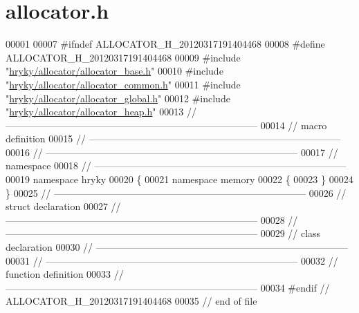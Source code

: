 \hypertarget{allocator_8h_source}{\section{allocator.\-h}
}

\begin{DoxyCode}
00001 
00007 \textcolor{preprocessor}{#ifndef ALLOCATOR\_H\_20120317191404468}
00008 \textcolor{preprocessor}{}\textcolor{preprocessor}{#define ALLOCATOR\_H\_20120317191404468}
00009 \textcolor{preprocessor}{}\textcolor{preprocessor}{#include "\hyperlink{allocator__base_8h}{hryky/allocator/allocator_base.h}"}
00010 \textcolor{preprocessor}{#include "\hyperlink{allocator__common_8h}{hryky/allocator/allocator_common.h}"}
00011 \textcolor{preprocessor}{#include "\hyperlink{allocator__global_8h}{hryky/allocator/allocator_global.h}"}
00012 \textcolor{preprocessor}{#include "\hyperlink{allocator__heap_8h}{hryky/allocator/allocator_heap.h}"}
00013 \textcolor{comment}{//
      ------------------------------------------------------------------------------}
00014 \textcolor{comment}{// macro definition}
00015 \textcolor{comment}{//
      ------------------------------------------------------------------------------}
00016 \textcolor{comment}{//
      ------------------------------------------------------------------------------}
00017 \textcolor{comment}{// namespace}
00018 \textcolor{comment}{//
      ------------------------------------------------------------------------------}
00019 \textcolor{keyword}{namespace }hryky
00020 \{
00021 \textcolor{keyword}{namespace }memory
00022 \{
00023 \}
00024 \}
00025 \textcolor{comment}{//
      ------------------------------------------------------------------------------}
00026 \textcolor{comment}{// struct declaration}
00027 \textcolor{comment}{//
      ------------------------------------------------------------------------------}
00028 \textcolor{comment}{//
      ------------------------------------------------------------------------------}
00029 \textcolor{comment}{// class declaration}
00030 \textcolor{comment}{//
      ------------------------------------------------------------------------------}
00031 \textcolor{comment}{//
      ------------------------------------------------------------------------------}
00032 \textcolor{comment}{// function definition}
00033 \textcolor{comment}{//
      ------------------------------------------------------------------------------}
00034 \textcolor{preprocessor}{#endif // ALLOCATOR\_H\_20120317191404468}
00035 \textcolor{preprocessor}{}\textcolor{comment}{// end of file}
\end{DoxyCode}
